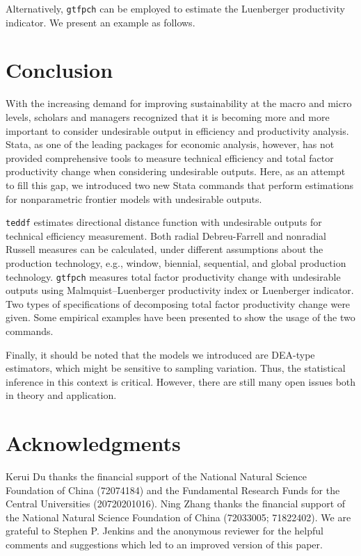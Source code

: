 \begin{stlog}
	
\end{stlog}

Alternatively, {\tt gtfpch} can be employed to estimate the Luenberger productivity indicator. We present an example as follows.  

\begin{stlog}
	
\end{stlog}



\section{Conclusion}\label{sec_conclusion}
With the increasing demand for improving sustainability at the macro and micro levels, scholars and managers recognized that it is becoming more and more important to consider undesirable output in efficiency and productivity analysis. 
Stata, as one of the leading packages for economic analysis, however, has not provided comprehensive tools to measure technical efficiency and total factor productivity change when considering undesirable outputs. 
Here, as an attempt to fill this gap, we introduced two new Stata commands that perform estimations for nonparametric frontier models with undesirable outputs.

{\tt teddf} estimates directional distance function with undesirable outputs for technical efficiency measurement. Both radial Debreu-Farrell and nonradial Russell measures can be calculated, under different assumptions about the production technology, e.g., window, biennial, sequential, and global production technology.
{\tt gtfpch} measures total factor productivity change with undesirable outputs using Malmquist–Luenberger productivity index or Luenberger indicator. Two types of specifications of decomposing total factor productivity change were given. 
Some empirical examples have been presented to show the usage of the two commands.

Finally, it should be noted that the models we introduced are DEA-type estimators, which might be sensitive to sampling variation. Thus, the statistical inference in this context is critical. However, there are still many open issues both in theory and application.



\section{Acknowledgments}
Kerui Du thanks the financial support of the National Natural Science Foundation of China (72074184) and the Fundamental Research Funds for the Central Universities (20720201016). Ning Zhang thanks the financial support of the National Natural Science Foundation of China (72033005; 71822402). We are grateful to Stephen P. Jenkins and the anonymous reviewer for the helpful comments and suggestions which led to an improved version of this paper.


\endinput
